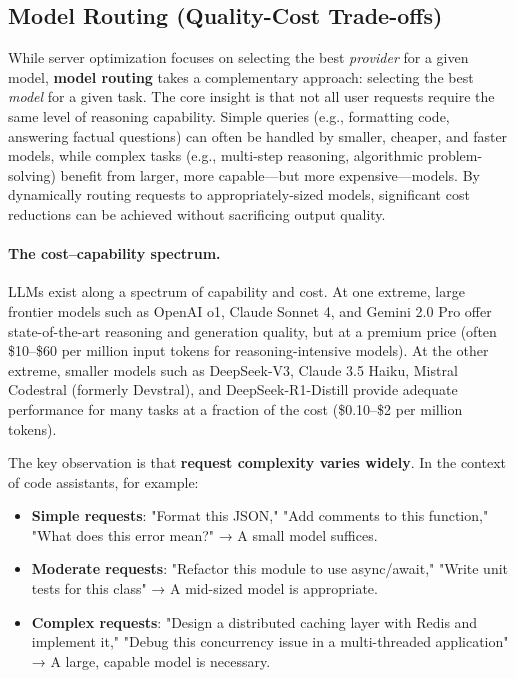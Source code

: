 \documentclass[english]{article}
\begin{document}
\subsection{Model Routing (Quality-Cost Trade-offs)}

While server optimization focuses on selecting the best \emph{provider} for a given model, \textbf{model routing} takes a complementary approach: selecting the best \emph{model} for a given task. The core insight is that not all user requests require the same level of reasoning capability. Simple queries (e.g., formatting code, answering factual questions) can often be handled by smaller, cheaper, and faster models, while complex tasks (e.g., multi-step reasoning, algorithmic problem-solving) benefit from larger, more capable—but more expensive—models. By dynamically routing requests to appropriately-sized models, significant cost reductions can be achieved without sacrificing output quality.

\paragraph{The cost–capability spectrum.}

LLMs exist along a spectrum of capability and cost. At one extreme, large frontier models such as OpenAI o1, Claude Sonnet 4, and Gemini 2.0 Pro offer state-of-the-art reasoning and generation quality, but at a premium price (often \$10--\$60 per million input tokens for reasoning-intensive models). At the other extreme, smaller models such as DeepSeek-V3, Claude 3.5 Haiku, Mistral Codestral (formerly Devstral), and DeepSeek-R1-Distill provide adequate performance for many tasks at a fraction of the cost (\$0.10--\$2 per million tokens).

The key observation is that \textbf{request complexity varies widely}. In the context of code assistants, for example:
\begin{itemize}
    \item \textbf{Simple requests}: "Format this JSON," "Add comments to this function," "What does this error mean?" → A small model suffices.
    \item \textbf{Moderate requests}: "Refactor this module to use async/await," "Write unit tests for this class" → A mid-sized model is appropriate.
    \item \textbf{Complex requests}: "Design a distributed caching layer with Redis and implement it," "Debug this concurrency issue in a multi-threaded application" → A large, capable model is necessary.
\end{itemize}
\end{document}
